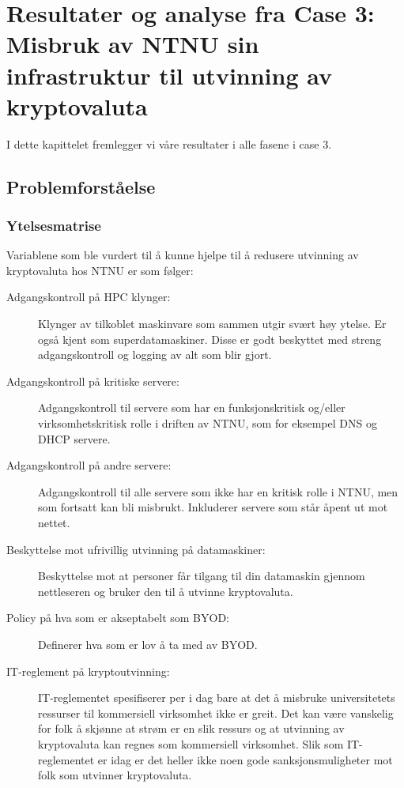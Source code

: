 \chapter{Resultater og analyse fra Case 3: Misbruk av NTNU sin infrastruktur til utvinning av kryptovaluta}
I dette kapittelet fremlegger vi våre resultater i alle fasene i case 3.
\section{Problemforståelse}
\subsection{Ytelsesmatrise}
Variablene som ble vurdert til å kunne hjelpe til å redusere utvinning av kryptovaluta hos NTNU er som følger:
\begin{description}
    \item[Adgangskontroll på HPC klynger:] Klynger av tilkoblet maskinvare som sammen utgir svært høy ytelse. Er også kjent som superdatamaskiner. Disse er godt beskyttet med streng adgangskontroll og logging av alt som blir gjort.
    \item[Adgangskontroll på kritiske servere:] Adgangskontroll til servere som har en funksjonskritisk og/eller virksomhetskritisk rolle i driften av NTNU, som for eksempel DNS og DHCP servere. 
    \item[Adgangskontroll på andre servere:] Adgangskontroll til alle servere som ikke har en kritisk rolle i NTNU, men som fortsatt kan bli misbrukt. Inkluderer servere som står åpent ut mot nettet. 
    \item[Beskyttelse mot ufrivillig utvinning på datamaskiner:] Beskyttelse mot at personer får tilgang til din datamaskin gjennom nettleseren og bruker den til å utvinne kryptovaluta. 
    \item[Policy på hva som er akseptabelt som BYOD:] Definerer hva som er lov å ta med av BYOD.
    \item[IT-reglement på kryptoutvinning:] IT-reglementet spesifiserer per i dag bare at det å misbruke universitetets ressurser til kommersiell virksomhet ikke er greit. Det kan være vanskelig for folk å skjønne at strøm er en slik ressurs og at utvinning av kryptovaluta kan regnes som kommersiell virksomhet. Slik som IT-reglementet er idag er det heller ikke noen gode sanksjonsmuligheter mot folk som utvinner kryptovaluta.
\end{description}

